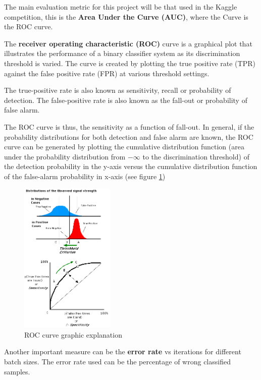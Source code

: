 \documentclass[]{article}
\begin{document}
The main evaluation metric for this project will be that used in the Kaggle competition, this is the \textbf{Area Under the Curve (AUC)}, where the Curve is the ROC curve.

The \textbf{receiver operating characteristic (ROC)} curve is a graphical plot that illustrates the performance of a binary classifier system as its discrimination threshold is varied. The curve is created by plotting the true positive rate (TPR) against the false positive rate (FPR) at various threshold settings.

The true-positive rate is also known as sensitivity, recall or probability of detection. The false-positive rate is also known as the fall-out or probability of false alarm. 

The ROC curve is thus, the sensitivity as a function of fall-out. In general, if the probability distributions for both detection and false alarm are known, the ROC curve can be generated by plotting the cumulative distribution function (area under the probability distribution from $-\infty$  to the discrimination threshold) of the detection probability in the y-axis versus the cumulative distribution function of the false-alarm probability in x-axis (see figure \ref{img:ROC})\cite{wikiROC}

\begin{figure}[htpb!]
\centering
\includegraphics[width= 0.4\textwidth]{images/ROCfig}
\caption{ROC curve graphic explanation \cite{wikiwand} \label{img:ROC}}
\end{figure}

Another important measure can be the \textbf{error rate} vs iterations for different batch sizes. The error rate used can be the percentage of wrong classified samples.
\end{document}
